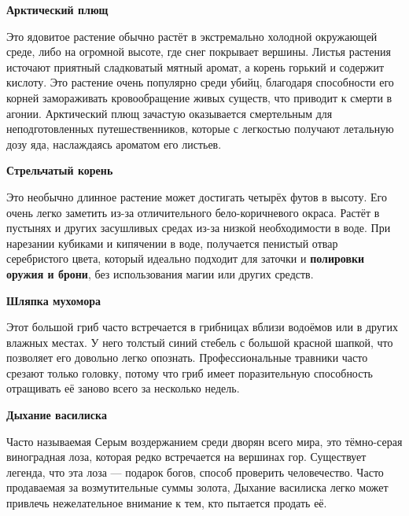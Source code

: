 \documentclass[a4paper, 9pt, twocolumn]{book}
\begin{document}
	\noindent \textbf{Арктический плющ}
	
	\smallskip
	
	\noindent  Это ядовитое растение обычно растёт в экстремально холодной окружающей среде, либо на огромной высоте, где снег покрывает вершины. Листья растения источают приятный сладковатый мятный аромат, а корень горький и содержит кислоту. Это растение очень популярно среди убийц, благодаря способности его корней замораживать кровообращение живых существ, что приводит к смерти в агонии. Арктический плющ зачастую оказывается смертельным для неподготовленных путешественников, которые с легкостью получают летальную дозу яда, наслаждаясь ароматом его листьев.
	
	\medspace
	
	\noindent \textbf{Стрельчатый корень}
	
	\smallskip
	
	\noindent Это необычно длинное растение может достигать четырёх футов в высоту. Его очень легко заметить из-за отличительного бело-коричневого окраса. Растёт в пустынях и других засушливых средах из-за низкой необходимости в воде. При нарезании кубиками и кипячении в воде, получается пенистый отвар серебристого цвета, который идеально подходит для заточки и \textbf{полировки оружия и брони}, без использования магии или других средств.
	
	\medspace
	
	\noindent \textbf{Шляпка мухомора}
	
	\smallskip
	
	\noindent Этот большой гриб часто встречается в грибницах вблизи водоёмов или в других влажных местах. У него толстый синий стебель с большой красной шапкой, что позволяет его довольно легко опознать. Профессиональные травники часто срезают только головку, потому что гриб имеет поразительную способность отращивать её заново всего за несколько недель.
	
	\medspace
	
	\noindent \textbf{Дыхание василиска}
	
	\smallskip
	
	\noindent Часто называемая Серым воздержанием среди дворян всего мира, это тёмно-серая виноградная лоза, которая редко встречается на вершинах гор. Существует легенда, что эта лоза --- подарок богов, способ проверить человечество. Часто продаваемая за возмутительные суммы золота, Дыхание василиска легко может привлечь нежелательное внимание к тем, кто пытается продать её.
	
	\medspace
	
\end{document}
